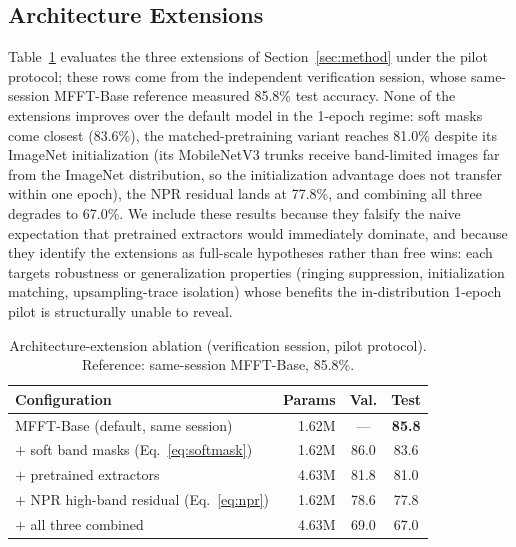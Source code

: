 \documentclass[journal]{IEEEtran}
\begin{document}
\subsection{Architecture Extensions}
\label{sec:extensions}
Table~\ref{tab:extensions} evaluates the three extensions of Section~\ref{sec:method} under the pilot protocol; these rows come from the independent verification session, whose same-session MFFT-Base reference measured 85.8\% test accuracy. None of the extensions improves over the default model in the 1-epoch regime: soft masks come closest (83.6\%), the matched-pretraining variant reaches 81.0\% despite its ImageNet initialization (its MobileNetV3 trunks receive band-limited images far from the ImageNet distribution, so the initialization advantage does not transfer within one epoch), the NPR residual lands at 77.8\%, and combining all three degrades to 67.0\%. We include these results because they falsify the naive expectation that pretrained extractors would immediately dominate, and because they identify the extensions as full-scale hypotheses rather than free wins: each targets robustness or generalization properties (ringing suppression, initialization matching, upsampling-trace isolation) whose benefits the in-distribution 1-epoch pilot is structurally unable to reveal.

\begin{table}[!t]
\renewcommand{\arraystretch}{1.2}
\caption{Architecture-extension ablation (verification session, pilot protocol). Reference: same-session MFFT-Base, 85.8\%.}
\label{tab:extensions}
\centering
\setlength{\tabcolsep}{4pt}
\begin{tabular}{lrcc}
\toprule
Configuration & Params & Val. & Test \\
\midrule
MFFT-Base (default, same session) & 1.62M & --- & \textbf{85.8} \\
$+$ soft band masks (Eq.~\eqref{eq:softmask}) & 1.62M & 86.0 & 83.6 \\
$+$ pretrained extractors & 4.63M & 81.8 & 81.0 \\
$+$ NPR high-band residual (Eq.~\eqref{eq:npr}) & 1.62M & 78.6 & 77.8 \\
$+$ all three combined & 4.63M & 69.0 & 67.0 \\
\bottomrule
\end{tabular}
\end{table}
\end{document}
